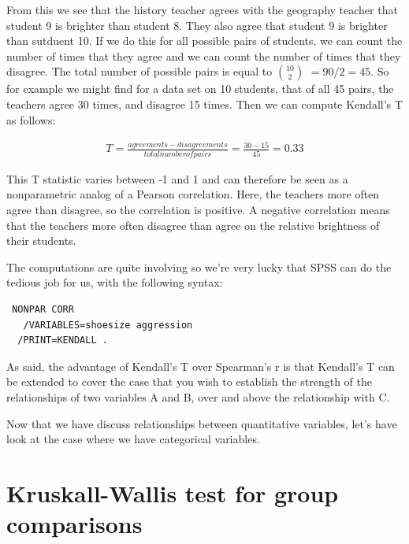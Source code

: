 \documentclass[]{report}\usepackage[]{graphicx}\usepackage[]{color}
\begin{document}
 From this we see that the history teacher agrees with the geography teacher that student 9 is brighter than student 8. They also agree that student 9 is brighter than sutduent 10. If we do this for all possible pairs of students, we can count the number of times that they agree and we can count the number of times that they disagree. The total number of possible pairs is equal to $10 \choose 2 $ $ = 90/2= 45$. So for example we might find for a data set on 10 students, that of all 45 pairs, the teachers agree 30 times, and disagree 15 times. Then we can compute Kendall's T as follows:
 
  \begin{eqnarray}
  T= \frac { agreements - disagreements }{total number of pairs} = \frac{30-15 }{45} = 0.33
  \end{eqnarray}

This T statistic varies between -1 and 1 and can therefore be seen as a nonparametric analog of a Pearson correlation. Here, the teachers more often agree than disagree, so the correlation is positive. A negative correlation means that the teachers more often disagree than agree on the relative brightness of their students. 

The computations are quite involving so we're very lucky that SPSS can do the tedious job for us, with the following syntax:


 \begin{verbatim}
 NONPAR CORR 
   /VARIABLES=shoesize aggression 
  /PRINT=KENDALL .
 \end{verbatim}


As said, the advantage of Kendall's T over Spearman's r is that Kendall's T can be extended to cover the case that you wish to establish the strength of the relationships of two variables A and B, over and above the relationship with C. %

        
Now that we have discuss relationships between quantitative variables, let's have look at the case where we have categorical variables.


\section{Kruskall-Wallis test for group comparisons}
\end{document}
